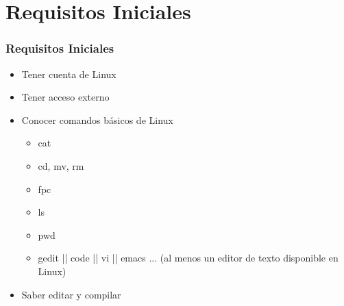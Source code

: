 \section{Requisitos Iniciales}

\begin{frame}
\frametitle{Requisitos Iniciales}

\begin{itemize}
	\item Tener cuenta de Linux
	\item Tener acceso externo
	\item Conocer comandos básicos de Linux
	\begin{itemize}
		\item cat
		\item cd, mv, rm
		\item fpc 
		\item ls
		\item pwd
		\item gedit || code || vi || emacs ... (al menos un editor de texto disponible en Linux)
	\end{itemize}
	\item Saber editar y compilar
\end{itemize}

\end{frame}
